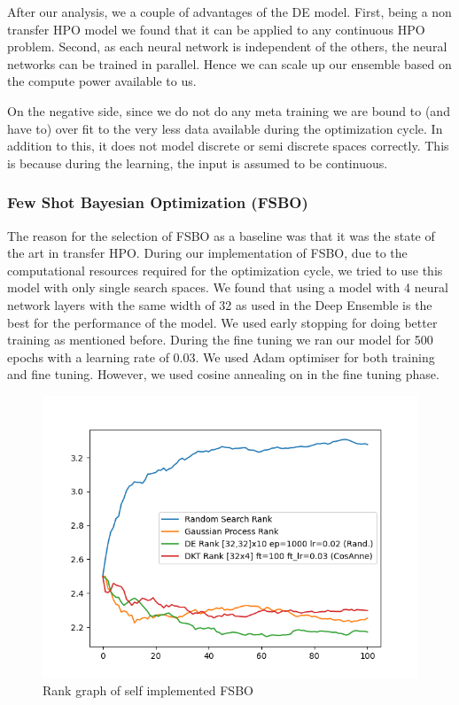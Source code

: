 \documentclass[12pt, twoside, ngerman]{report}
\begin{document}
After our analysis,  we a couple of advantages of the DE model.
First,  being a non transfer HPO model we found that it can be applied to any continuous HPO problem.
Second,  as each neural network is independent of the others,  the neural networks can be trained in parallel.
Hence we can scale up our ensemble based on the compute power available to us.

On the negative side,  since we do not do any meta training we are bound to (and have to) over fit to the very less data available during the optimization cycle.
In addition to this,  it does not model discrete or semi discrete spaces correctly. 
This is because during the learning,  the input is assumed to be continuous.


\subsubsection{Few Shot Bayesian Optimization (FSBO)}

The reason for the selection of FSBO as a baseline was that it was the state of the art in transfer HPO.
During our implementation of FSBO,  due to the computational resources required for the optimization cycle,  we tried to use this model with only single search spaces.
We found that using a model with 4 neural network layers with the same width of 32 as used in the Deep Ensemble is the best for the performance of the model.
We used early stopping for doing better training as mentioned before.
During the fine tuning we ran our model for 500 epochs with a learning rate of 0.03.
We used Adam optimiser for both training and fine tuning.
However,  we used cosine annealing on in the fine tuning phase.

\begin{figure}[h]
  \centering
    \includegraphics[scale=0.5]{images/FSBOPerformance}
    \caption{Rank graph of self implemented FSBO}
    \label{fig:FSBOPerformance}
\end{figure}
\end{document}

